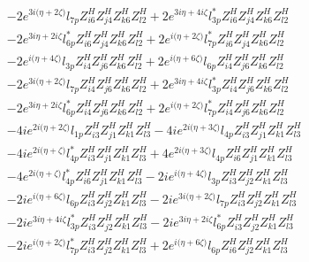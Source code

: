 \begin{align}
 &-2 e^{3 i \Big(\eta +2 \zeta \Big)} l_{7p} Z_{{i 6}}^{H} Z_{{j 4}}^{H} Z_{{k 6}}^{H} Z_{{l 2}}^{H} +2 e^{3 i \eta +4 i \zeta } l_{3p}^* Z_{{i 6}}^{H} Z_{{j 4}}^{H} Z_{{k 6}}^{H} Z_{{l 2}}^{H} \nonumber \\ 
 &-2 e^{3 i \eta +2 i \zeta } l_{6p}^* Z_{{i 6}}^{H} Z_{{j 4}}^{H} Z_{{k 6}}^{H} Z_{{l 2}}^{H} +2 e^{i \Big(\eta +2 \zeta \Big)} l_{7p}^* Z_{{i 6}}^{H} Z_{{j 4}}^{H} Z_{{k 6}}^{H} Z_{{l 2}}^{H} \nonumber \\ 
 &-2 e^{i \Big(\eta +4 \zeta \Big)} l_{3p} Z_{{i 4}}^{H} Z_{{j 6}}^{H} Z_{{k 6}}^{H} Z_{{l 2}}^{H} +2 e^{i \Big(\eta +6 \zeta \Big)} l_{6p} Z_{{i 4}}^{H} Z_{{j 6}}^{H} Z_{{k 6}}^{H} Z_{{l 2}}^{H} \nonumber \\ 
 &-2 e^{3 i \Big(\eta +2 \zeta \Big)} l_{7p} Z_{{i 4}}^{H} Z_{{j 6}}^{H} Z_{{k 6}}^{H} Z_{{l 2}}^{H} +2 e^{3 i \eta +4 i \zeta } l_{3p}^* Z_{{i 4}}^{H} Z_{{j 6}}^{H} Z_{{k 6}}^{H} Z_{{l 2}}^{H} \nonumber \\ 
 &-2 e^{3 i \eta +2 i \zeta } l_{6p}^* Z_{{i 4}}^{H} Z_{{j 6}}^{H} Z_{{k 6}}^{H} Z_{{l 2}}^{H} +2 e^{i \Big(\eta +2 \zeta \Big)} l_{7p}^* Z_{{i 4}}^{H} Z_{{j 6}}^{H} Z_{{k 6}}^{H} Z_{{l 2}}^{H} \nonumber \\ 
 &-4 i e^{2 i \Big(\eta +2 \zeta \Big)} l_{1p} Z_{{i 3}}^{H} Z_{{j 1}}^{H} Z_{{k 1}}^{H} Z_{{l 3}}^{H} -4 i e^{2 i \Big(\eta +3 \zeta \Big)} l_{4p} Z_{{i 3}}^{H} Z_{{j 1}}^{H} Z_{{k 1}}^{H} Z_{{l 3}}^{H} \nonumber \\ 
 &-4 i e^{2 i \Big(\eta +\zeta \Big)} l_{4p}^* Z_{{i 3}}^{H} Z_{{j 1}}^{H} Z_{{k 1}}^{H} Z_{{l 3}}^{H} +4 e^{2 i \Big(\eta +3 \zeta \Big)} l_{4p} Z_{{i 6}}^{H} Z_{{j 1}}^{H} Z_{{k 1}}^{H} Z_{{l 3}}^{H} \nonumber \\ 
 &-4 e^{2 i \Big(\eta +\zeta \Big)} l_{4p}^* Z_{{i 6}}^{H} Z_{{j 1}}^{H} Z_{{k 1}}^{H} Z_{{l 3}}^{H} -2 i e^{i \Big(\eta +4 \zeta \Big)} l_{3p} Z_{{i 3}}^{H} Z_{{j 2}}^{H} Z_{{k 1}}^{H} Z_{{l 3}}^{H} \nonumber \\ 
 &-2 i e^{i \Big(\eta +6 \zeta \Big)} l_{6p} Z_{{i 3}}^{H} Z_{{j 2}}^{H} Z_{{k 1}}^{H} Z_{{l 3}}^{H} -2 i e^{3 i \Big(\eta +2 \zeta \Big)} l_{7p} Z_{{i 3}}^{H} Z_{{j 2}}^{H} Z_{{k 1}}^{H} Z_{{l 3}}^{H} \nonumber \\ 
 &-2 i e^{3 i \eta +4 i \zeta } l_{3p}^* Z_{{i 3}}^{H} Z_{{j 2}}^{H} Z_{{k 1}}^{H} Z_{{l 3}}^{H} -2 i e^{3 i \eta +2 i \zeta } l_{6p}^* Z_{{i 3}}^{H} Z_{{j 2}}^{H} Z_{{k 1}}^{H} Z_{{l 3}}^{H} \nonumber \\ 
 &-2 i e^{i \Big(\eta +2 \zeta \Big)} l_{7p}^* Z_{{i 3}}^{H} Z_{{j 2}}^{H} Z_{{k 1}}^{H} Z_{{l 3}}^{H} +2 e^{i \Big(\eta +6 \zeta \Big)} l_{6p} Z_{{i 6}}^{H} Z_{{j 2}}^{H} Z_{{k 1}}^{H} Z_{{l 3}}^{H} \nonumber \\ 

\end{align}
